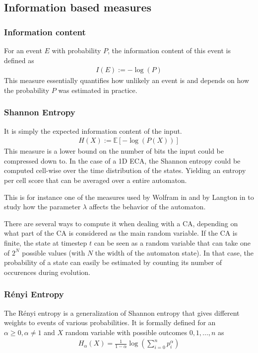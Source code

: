 \subsection{Information based measures}


\subsubsection{Information content}
For an event $E$ with probability $P$, the information content of this event is
defined as
\begin{align*}
  I(E) := -\log(P)
\end{align*}
This measure essentially quantifies how unlikely an event is and depends on how
the probability $P$ was estimated in practice.

\subsubsection{Shannon Entropy}
It is simply the expected information content of the input.
\begin{align*}
  H(X) := \mathbb{E}[-\log(P(X))]
\end{align*}
This measure is a lower bound on the number of bits the input could be
compressed down to. In the case of a 1D ECA, the Shannon entropy could be
computed cell-wise over the time distribution of the states. Yielding an entropy
per cell score that can be averaged over a entire automaton.

This is for instance one of the measures used by Wolfram in
\parencite{wolframStatisticalMechanicsCellular1983} and by Langton in
\parencite{langtonComputationEdgeChaos1990} to study how the parameter $\lambda$ affects
the behavior of the automaton.

There are several ways to compute it when dealing with a CA, depending on what
part of the CA is considered as the main random variable. If the CA is finite,
the state at timestep $t$ can be seen as a random variable that can take one of
$2^N$ possible values (with $N$ the width of the automaton state). In that case,
the probability of a state can easily be estimated by counting its number of
occurences during evolution.

\subsubsection{Rényi Entropy}
The Rényi entropy is a generalization of Shannon entropy that gives different
weights to events of various probabilities. It is formally defined for an
$\alpha \geq 0, \alpha \neq 1$ and $X$ random variable with possible outcomes
$0, 1, ..., n$ as
\begin{align*}
  H_\alpha(X) = \frac{1}{1-\alpha} \log\left(\sum_{i=0}^np_i^\alpha\right)
\end{align*}

